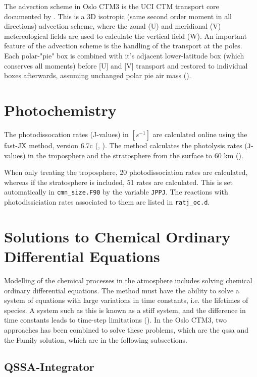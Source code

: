 \medskip

The advection scheme in Oslo CTM3 is the UCI CTM transport core documented by \cite{Prather2008}. This is a 3D isotropic (same second order moment in all directions) advection scheme, where the zonal (U) and meridional (V) metereological fields are used to calculate the vertical field (W). An important feature of the advection scheme is the handling of the transport at the poles. Each polar-"pie" box is combined with it's adjacent lower-latitude box (which conserves all moments) before [U] and [V] transport and restored to individual boxes afterwards, assuming unchanged polar pie air mass (\cite{Sovde2012}). 


\section{Photochemistry}\label{sec:CTM3_photochemistry}

The photodissocation rates (J-values) in $[s^{-1}]$ are calculated online using the fast-JX method, version 6.7c (\cite{FastJX}, \cite{SovdeManual}). The method calculates the photolysis rates (\texttt{J}-values) in the troposphere and the stratosphere from the surface to 60 km (\cite{Sovde2012}). 

\medskip

When only treating the troposphere, 20 photodissociation rates are calculated, whereas if the stratosphere is included, 51 rates are calculated. This is set automatically in \texttt{cmn\_size.F90} by the variable \texttt{JPPJ}. The reactions with photodissiciation rates associated to them are listed in \texttt{ratj\_oc.d}. 

\section{Solutions to Chemical Ordinary Differential Equations}

Modelling of the chemical processes in the atmosphere includes solving chemical ordinary differential equations. The method must have the ability to solve a system of equations with large variations in time constants, i.e. the lifetimes of species. A system such as this is known as a stiff system, and the difference in time constants leads to time-step limitations (\cite{AtmModFund}). In the Oslo CTM3, two approaches has been combined to solve these problems, which are the \acrfull{qssa} and the Family solution, which are in the following subsections. 

\subsection{QSSA-Integrator}\label{sec:QSSA}

